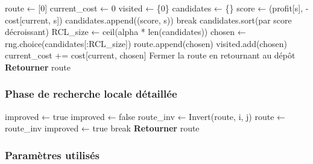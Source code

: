 \documentclass[11pt,a4paper]{article}
\begin{document}
\begin{algorithm}[H]
\caption{ConstructRoute (GRASP)}
\begin{algorithmic}[1]
    \State route ← [0] 
    \State current\_cost ← 0
    \State visited ← \{0\}
        \State candidates ← \{\} 
            \State score ← (profit[s], -cost[current, s])
            \State candidates.append((score, s))
        \EndFor
            \State break
        \EndIf
        \State candidates.sort(par score décroissant)
        \State RCL\_size ← ceil(alpha * len(candidates)) 
        \State chosen ← rng.choice(candidates[:RCL\_size])
        \State route.append(chosen)
        \State visited.add(chosen)
        \State current\_cost += cost[current, chosen]
    \EndWhile
    \State Fermer la route en retournant au dépôt
    \State \textbf{Retourner} route
\EndFunction
\end{algorithmic}
\end{algorithm}

\subsubsection*{Phase de recherche locale détaillée}

\begin{algorithm}[H]
\caption{LocalSearch (GRASP)}
\begin{algorithmic}[1]
    \State improved ← true
        \State improved ← false
            \State route\_inv ← Invert(route, i, j) 
                \State route ← route\_inv
                \State improved ← true
                \State break
            \EndIf
        \EndFor
    \EndWhile
    \State \textbf{Retourner} route
\EndFunction
\end{algorithmic}
\end{algorithm}

\subsubsection*{Paramètres utilisés}
\end{document}
